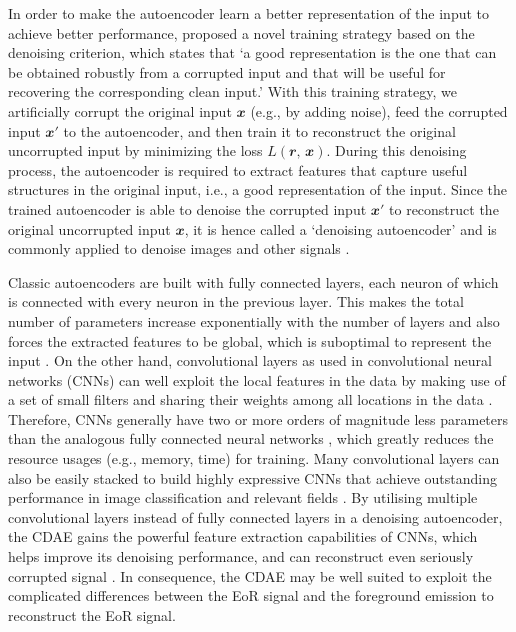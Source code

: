 \documentclass[fleqn,usenatbib]{mnras}
\newcommand{\B}[1]{\mathbfit{#1}}
\newcommand{\editone}[1]{{\leavevmode\color{cyan}#1}}
\begin{document}
\editone{%
In order to make the autoencoder learn a better representation of the input
to achieve better performance, \citet{vincent2008,vincent2010} proposed a
novel training strategy based on the denoising criterion,
which states that `a good representation is the one that can be obtained
robustly from a corrupted input and that will be useful for recovering the
corresponding clean input.'
With this training strategy, we artificially corrupt the original input
$\B{x}$ (e.g., by adding noise), feed the corrupted input $\B{x}'$ to the
autoencoder, and then train it to reconstruct the original uncorrupted
input by minimizing the loss $L(\B{r}, \,\B{x})$.
During this denoising process, the autoencoder is required to extract
features that capture useful structures in the original input, i.e., a good
representation of the input.
Since the trained autoencoder is able to denoise the corrupted input
$\B{x}'$ to reconstruct the original uncorrupted input $\B{x}$, it is hence
called a `denoising autoencoder' and is commonly applied to denoise images
and other signals \citep[e.g.,][]{xie2012,bengio2013,gondara2016}.

Classic autoencoders are built with fully connected layers, each neuron of
which is connected with every neuron in the previous layer.
This makes the total number of parameters increase exponentially with the
number of layers and also forces the extracted features to be global, which
is suboptimal to represent the input \citep[e.g.,][]{masci2011}.
On the other hand, convolutional layers as used in convolutional neural
networks (CNNs) can well exploit the local features in the data by making
use of a set of small filters and sharing their weights among all
locations in the data \citep[e.g.,][]{lecun1998}.
Therefore, CNNs generally have two or more orders of magnitude less
parameters than the analogous fully connected neural networks
\citep[e.g.,][]{grais2017}, which greatly reduces the resource usages
(e.g., memory, time) for training.
Many convolutional layers can also be easily stacked to build highly
expressive CNNs that achieve outstanding performance in image
classification and relevant fields
\citep[e.g.,][]{krizhevsky2012,simonyan2014,szegedy2015,ma2018}.
By utilising multiple convolutional layers instead of fully connected
layers in a denoising autoencoder, the CDAE gains the powerful feature
extraction capabilities of CNNs, which helps improve its denoising
performance, and can reconstruct even seriously corrupted signal
\citep[e.g.,][]{du2017}.
In consequence, the CDAE may be well suited to exploit the complicated
differences between the EoR signal and the foreground emission to
reconstruct the EoR signal.
}  %
\end{document}

